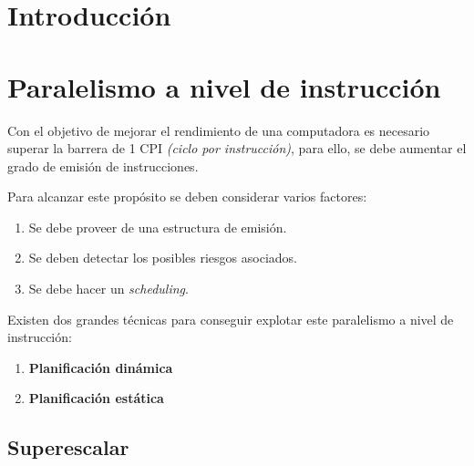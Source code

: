 
\section{Introducción}
\label{1:sec:1}



\section{Paralelismo a nivel de instrucción}
\label{1:sec:2}

Con el objetivo de mejorar el rendimiento de una computadora es necesario superar la barrera
de 1 CPI \textit{(ciclo por instrucción)}, para ello, se debe aumentar el grado de emisión de 
instrucciones.

\bigskip
Para alcanzar este propósito se deben considerar varios factores:

\begin{enumerate}

\item Se debe proveer de una estructura de emisión.

\item Se deben detectar los posibles riesgos asociados. 

\item Se debe hacer un \textit{scheduling}.

\end{enumerate}

\bigskip
Existen dos grandes técnicas para conseguir explotar este paralelismo a nivel de instrucción:

\begin{enumerate}

\item \textbf{Planificación dinámica}

\item \textbf{Planificación estática}

\end{enumerate}

\subsection{Superescalar}

